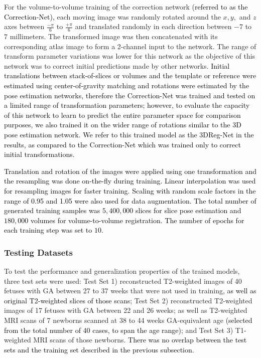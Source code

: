 \documentclass[journal,transmag]{IEEEtran}
\begin{document}
For the volume-to-volume training of the correction network \textcolor{black}{(referred to as the Correction-Net),} each moving image was randomly rotated around the $x, y,$ and $z$ axes between $\frac{-\pi}{6}$ to $\frac{+\pi}{6}$ and translated randomly in each direction between $-7$ to $7$ millimeters. The transformed image was then concatenated with its corresponding atlas image to form a 2-channel input to the network. The range of transform parameter variations was lower for this network as the objective of this network was to correct initial predictions made by other networks. \textcolor{black}{Initial translations between stack-of-slices or volumes and the template or reference were estimated using center-of-gravity matching and rotations were estimated by the pose estimation networks, therefore the Correction-Net was trained and tested on a limited range of transformation parameters; however, to evaluate the capacity of this network to learn to predict the entire parameter space for comparison purposes, we also trained it on the wider range of rotations similar to the 3D pose estimation network.  
We refer to this trained model as the 3DReg-Net in the results, as compared to the Correction-Net which was trained only to correct initial transformations.}

\textcolor{black}{Translation and rotation of the images were applied using one transformation and the resampling was done on-the-fly during training. Linear interpolation was used for resampling images for faster training. Scaling with random scale factors in the range of 0.95 and 1.05 were also used for data augmentation. The total number of generated training samples was $5,400,000$ slices for slice pose estimation and $180,000$ volumes for volume-to-volume registration. The number of epochs for each training step was set to $10$.}  

\subsubsection{Testing Datasets}
To test the performance and generalization properties of the trained models, three test sets were used: Test Set 1) reconstructed T2-weighted images of 40 fetuses with GA between 27 to 37 weeks that were not used in training\textcolor{black}{, as well as original T2-weighted slices of those scans}; Test Set 2) reconstructed T2-weighted images of 17 fetuses with GA between 22 and 26 weeks; as well as T2-weighted MRI scans of 7 newborns scanned at 38 to 44 weeks GA-equivalent age \textcolor{black}{(selected from the total number of 40 cases, to span the age range)}; and Test Set 3) T1-weighted MRI scans of those newborns. \textcolor{black}{There was no overlap between the test sets and the training set described in the previous subsection.}
\end{document}
